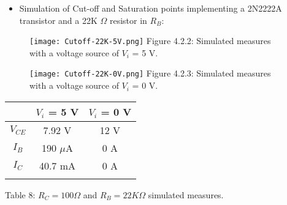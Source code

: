 \pagebreak

{\bfseries\itshape
\begin{itemize}
\item Simulation of Cut-off and Saturation points implementing a 2N2222A transistor and a 22K $\Omega$ resistor in $R_{B}$:
\end{itemize}}

\begin{multicols}{2}
\begin{figure}[H]
\texttt{[image: Cutoff-22K-5V.png]}
\centering \linebreak \linebreak Figure 4.2.2: Simulated measures with a voltage source of $V_{i}$ = 5 V.
\end{figure}

\begin{figure}[H]
\texttt{[image: Cutoff-22K-0V.png]}
\centering \linebreak \linebreak Figure 4.2.3: Simulated measures with a voltage source of $V_{i}$ = 0 V.
\end{figure}
\end{multicols}

\begin{center}
\begin{tabular}[.5cm]{c c c}
\toprule
\toprule
\hspace{120pt} & \hspace{50pt} {\bfseries $V_{i}$ = 5 V} \hspace{50pt} & \hspace{50pt} {\bfseries $V_{i}$ = 0 V} \hspace{50pt} \\
\midrule
\midrule
$V_{CE}$ & 7.92 V & 12 V \\
\cmidrule{1-3}
$I_{B}$ & 190 $\mu$A & 0 A \\
\cmidrule{1-3}
$I_{C}$ & 40.7 mA & 0 A \\
\bottomrule
\linebreak
\end{tabular}
\linebreak Table 8: $R_{C} = 100 \Omega$ and $R_{B} = 22K \Omega$ simulated measures.
\end{center}

\pagebreak
